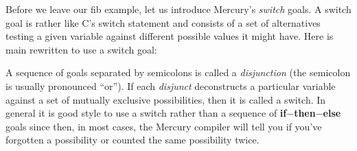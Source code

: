 \documentclass[a4paper,11pt,notitlepage,onecolumn]{book}
\begin{document}
Before we leave our \textsf{fib} example, let us introduce Mercury's \emph{switch}
goals.  A switch goal is rather like C's \textsf{switch} statement and consists of
a set of alternatives testing a given variable against different possible
values it might have.  Here is \textsf{main} rewritten to use a switch goal:
\begin{small}

\begin{ptabular}
\nextline
{}
\nextline
{}
\nextline
{}
\nextline
{}
\nextline
{}
\nextline
{}
\nextline
{}
\nextline
{}
\nextline
{}
\nextline
{}
\nextline
{}
\nextline
{}
\nextline
{}
\nextline
{}
\nextline
{}
\nextline
\end{ptabular}

\end{small}
A sequence of goals separated by semicolons is called a \emph{disjunction}
(the semicolon is usually pronounced ``or'').  If each \emph{disjunct}
deconstructs a particular variable against a set of mutually exclusive
possibilities, then it is called a switch.  In general it is good style to
use a switch rather than a sequence of \textsf{\textbf{if}{\ensuremath{-}}\textbf{then}{\ensuremath{-}}\textbf{else}} goals since then, in
most cases, the Mercury compiler will tell you if you've forgotten a
possibility or counted the same possibility twice.
\end{document}
